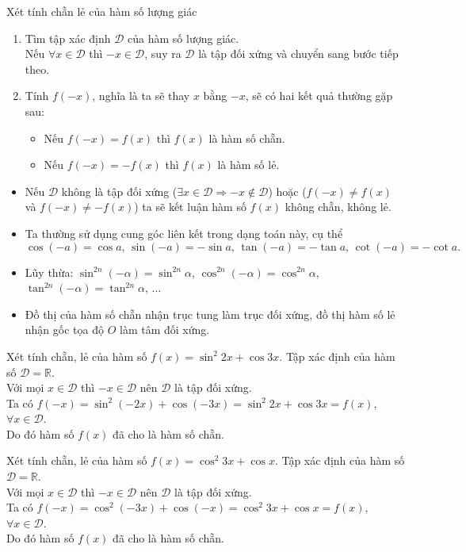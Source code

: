 \begin{dang}{Xét tính chẵn lẻ của hàm số lượng giác}
	\begin{enumerate}[\bf Bước 1.]
		\item Tìm tập xác định $\mathscr{D}$ của hàm số lượng giác.\\
		Nếu $\forall x\in\mathscr{D}$ thì $-x\in\mathscr{D}$, suy ra $\mathscr{D}$ là tập đối xứng và chuyển sang bước tiếp theo.
		\item Tính $f(-x)$, nghĩa là ta sẽ thay $x$ bằng $-x$, sẽ có hai kết quả thường gặp sau:
		\begin{itemize}
			\item Nếu $f(-x)=f(x)$ thì $f(x)$ là hàm số chẵn.
			\item Nếu $f(-x)=-f(x)$ thì $f(x)$ là hàm số lẻ.
		\end{itemize}
	\end{enumerate}
	\begin{note}
		\begin{itemize}
			\item Nếu $\mathscr{D}$ không là tập đối xứng ($\exists x\in\mathscr{D}\Rightarrow -x\not\in\mathscr{D}$) hoặc ($f(-x)\ne f(x)$ và $f(-x)\ne -f(x)$) ta sẽ kết luận hàm số $f(x)$ không chẵn, không lẻ.
			\item Ta thường sử dụng cung góc liên kết trong dạng toán này, cụ thể
			\[\cos(-a)=\cos a,\,\sin(-a)=-\sin a,\,\tan(-a)=-\tan a,\,\cot(-a)=-\cot a.\]
			\item Lũy thừa: $\sin^{2n}(-\alpha)=\sin^{2n}\alpha$, $\cos^{2n}(-\alpha)=\cos^{2n}\alpha$, $\tan^{2n}(-\alpha)=\tan^{2n}\alpha$, $\dots$
			\item Đồ thị của hàm số chẵn nhận trục tung làm trục đối xứng, đồ thị hàm số lẻ nhận gốc tọa độ $O$ làm tâm đối xứng.
		\end{itemize}
	\end{note}
\end{dang}
\setcounter{bt}{0}
\begin{bt}%
	Xét tính chẵn, lẻ của hàm số $f(x)=\sin^2 2x+\cos 3x$.
	\loigiai
	{
		Tập xác định của hàm số $\mathscr{D}=\mathbb{R}$.\\
		Với mọi $x\in\mathscr{D}$ thì $-x\in\mathscr{D}$ nên $\mathscr{D}$ là tập đối xứng.\\
		Ta có $f(-x)=\sin^2(-2x)+\cos(-3x)=\sin^2 2x+\cos 3x=f(x)$, $\forall x\in\mathscr{D}$.\\
		Do đó hàm số $f(x)$ đã cho là hàm số chẵn.
	}
\end{bt}
\begin{bt}%
	Xét tính chẵn, lẻ của hàm số $f(x)=\cos^2 3x+\cos x$.
	\loigiai
	{
		Tập xác định của hàm số $\mathscr{D}=\mathbb{R}$.\\
		Với mọi $x\in\mathscr{D}$ thì $-x\in\mathscr{D}$ nên $\mathscr{D}$ là tập đối xứng.\\
		Ta có $f(-x)=\cos^2(-3x)+\cos(-x)=\cos^2 3x+\cos x=f(x)$, $\forall x\in\mathscr{D}$.\\
		Do đó hàm số $f(x)$ đã cho là hàm số chẵn.
	}
\end{bt}
